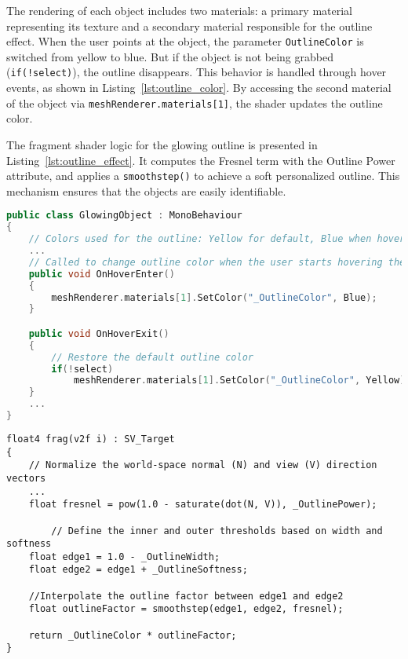 The rendering of each object includes two materials: a primary material representing its texture and a secondary material responsible for the outline effect.
When the user points at the object, the parameter \texttt{OutlineColor} is switched from yellow to blue. But if the object is not being grabbed (\texttt{if(!select)}), the outline disappears. 
This behavior is handled through hover events, as shown in Listing~\ref{lst:outline_color}. 
By accessing the second material of the object via \texttt{meshRenderer.materials[1]}, the shader updates the outline color.  

The fragment shader logic for the glowing outline is presented in Listing~\ref{lst:outline_effect}. 
It computes the Fresnel term with the Outline Power attribute, and applies a \texttt{smoothstep()} to achieve a soft personalized outline.  
This mechanism ensures that the objects are easily identifiable. 

\begin{lstlisting}[language=C++, caption={Partial class with Outline Color changed when the object is Hovered.}, label={lst:outline_color},float]
    public class GlowingObject : MonoBehaviour
{
    // Colors used for the outline: Yellow for default, Blue when hovered
    ...
    // Called to change outline color when the user starts hovering the object
    public void OnHoverEnter()
    {
        meshRenderer.materials[1].SetColor("_OutlineColor", Blue);
    }

    public void OnHoverExit()
    {
        // Restore the default outline color
        if(!select)
            meshRenderer.materials[1].SetColor("_OutlineColor", Yellow);
    }
    ...
}
\end{lstlisting}


\begin{lstlisting}[language=HLSL, caption={Partial Fragment shader for creating an outline effect to the object.}, label={lst:outline_effect},float]
float4 frag(v2f i) : SV_Target
{
    // Normalize the world-space normal (N) and view (V) direction vectors
    ...
    float fresnel = pow(1.0 - saturate(dot(N, V)), _OutlinePower);

        // Define the inner and outer thresholds based on width and softness
    float edge1 = 1.0 - _OutlineWidth;
    float edge2 = edge1 + _OutlineSoftness;

    //Interpolate the outline factor between edge1 and edge2
    float outlineFactor = smoothstep(edge1, edge2, fresnel);

    return _OutlineColor * outlineFactor;
}
\end{lstlisting}

